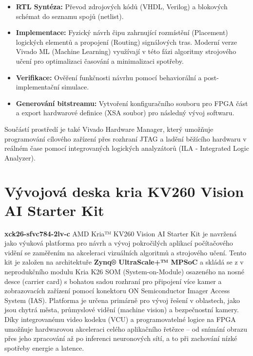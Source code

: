 \begin{itemize}
    \item \textbf{RTL Syntéza:} Převod zdrojových kódů (VHDL, Verilog) a blokových schémat do seznamu spojů (netlist).
    
    \item \textbf{Implementace:} Fyzický návrh čipu zahrnující rozmístění (Placement) logických elementů a propojení (Routing) signálových tras. Moderní verze Vivado ML (Machine Learning) využívají v této fázi algoritmy strojového učení pro optimalizaci časování a minimalizaci spotřeby.
    
    \item \textbf{Verifikace:} Ověření funkčnosti návrhu pomocí behaviorální a post-implementační simulace.
    
    \item \textbf{Generování bitstreamu:} Vytvoření konfiguračního souboru pro FPGA část a export hardwarové definice (XSA soubor) pro následný vývoj softwaru.
\end{itemize}

Součástí prostředí je také Vivado Hardware Manager, který umožňuje programování cílového zařízení přes rozhraní JTAG a ladění běžícího hardwaru v reálném čase pomocí integrovaných logických analyzátorů (ILA - Integrated Logic Analyzer).

\section{Vývojová deska kria KV260 Vision AI Starter Kit}

\textbf{xck26-sfvc784-2lv-c
}
AMD Kria™ KV260 Vision AI Starter Kit je navržená jako výuková platforma pro návrh a vývoj pokročilých aplikací počítačového vidění se zaměřením na akceleraci vizuálních algoritmů a strojového učení. Tento kit je založen na architektuře \textbf{Zynq® UltraScale+™ MPSoC} a skládá se z v neprodukčního modulu Kria K26 SOM (System-on-Module) osazeného na nosné desce (carrier card) s bohatou sadou rozhraní pro připojení více kamer a zobrazovacích zařízení pomocí konektoru ON Semiconductor Imager Access System (IAS).
Platforma je určena primárně pro vývoj řešení v oblastech, jako jsou chytrá města, průmyslové vidění (machine vision) a bezpečnostní kamery. Díky integrovanému video kodeku (VCU) a programovatelné logice na FPGA umožňuje hardwarovou akceleraci celého aplikačního řetězce – od snímání obrazu přes jeho zpracování až po inferenci neuronových sítí, a to při zachování nízké spotřeby energie a latence. \cite{amd_kv260}

